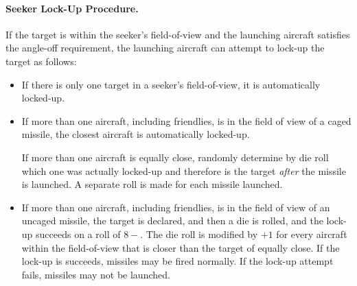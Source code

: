 {\paragraph{Seeker Lock-Up Procedure.} If the target is within the seeker’s field-of-view and the launching aircraft satisfies the angle-off requirement, the launching aircraft can attempt to lock-up the target as follows:

\begin{itemize}
    \item If there is only one target in a seeker’s field-of-view, it is automatically locked-up.

    \item If more than one aircraft, including friendlies, is in the field of view of a caged missile, the closest aircraft is automatically locked-up. 
    
    If more than one aircraft is equally close, randomly determine by die roll which one was actually locked-up and therefore is the target \emph{after} the missile is launched. A separate roll is made for each missile launched.

    \item If more than one aircraft, including friendlies, is in the field of view of an uncaged missile, the target is declared, and then a die is rolled, and the lock-up succeeds on a roll of $8-$. The die roll is modified by  $+1$ for every aircraft within the field-of-view that is closer than the target of equally close. If the lock-up is succeeds, missiles may be fired normally. If the lock-up attempt fails, missiles may not be launched.

\end{itemize}

}

